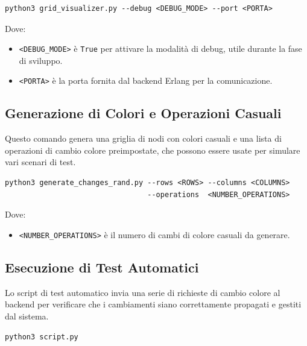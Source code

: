 \documentclass[12pt, a4paper]{report}
\begin{document}
\begin{tcolorbox}[title=Comandi di Avvio del Server Flask]
\begin{verbatim}
python3 grid_visualizer.py --debug <DEBUG_MODE> --port <PORTA>
\end{verbatim}
\end{tcolorbox}

\noindent Dove:
\begin{itemize}
    \item \texttt{<DEBUG\_MODE>} è \texttt{True} per attivare la modalità di debug, utile durante la fase di sviluppo.
    \item \texttt{<PORTA>} è la porta fornita dal backend Erlang per la comunicazione.
\end{itemize}


\subsection{Generazione di Colori e Operazioni Casuali}
Questo comando genera una griglia di nodi con colori casuali e una lista di operazioni di cambio colore preimpostate, che possono essere usate per simulare vari scenari di test.

\begin{tcolorbox}[title=Generazione di Colori e Operazioni Casuali]
\begin{verbatim}
python3 generate_changes_rand.py --rows <ROWS> --columns <COLUMNS> 
                                 --operations  <NUMBER_OPERATIONS>
\end{verbatim}
\end{tcolorbox}




\noindent Dove:
\begin{itemize}
    \item \texttt{<NUMBER\_OPERATIONS>} è il numero di cambi di colore casuali da generare.
\end{itemize}

\subsection{Esecuzione di Test Automatici}
Lo script di test automatico invia una serie di richieste di cambio colore al backend per verificare che i cambiamenti siano correttamente propagati e gestiti dal sistema.

\begin{tcolorbox}[title=Esecuzione di Test Automatici]
\begin{verbatim}
python3 script.py
\end{verbatim}
\end{tcolorbox}
\end{document}
